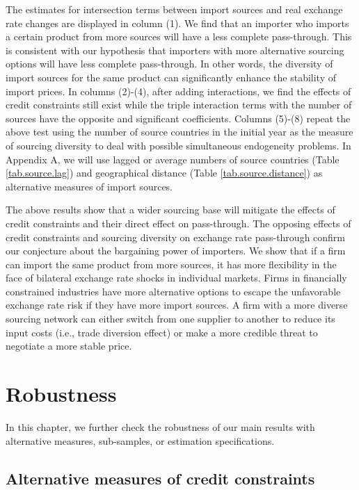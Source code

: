 \documentclass[12pt]{article}
\begin{document}
The estimates for intersection terms between import sources and real exchange rate changes are displayed in column (1). We find that an importer who imports a certain product from more sources will have a less complete pass-through. This is consistent with our hypothesis that importers with more alternative sourcing options will have less complete pass-through. In other words, the diversity of import sources for the same product can significantly enhance the stability of import prices. In columns (2)-(4), after adding interactions, we find the effects of credit constraints still exist while the triple interaction terms with the number of sources have the opposite and significant coefficients. Columns (5)-(8) repeat the above test using the number of source countries in the initial year as the measure of sourcing diversity to deal with possible simultaneous endogeneity problems. In Appendix A, we will use lagged or average numbers of source countries (Table \ref{tab.source.lag}) and geographical distance (Table \ref{tab.source.distance}) as alternative measures of import sources.

The above results show that a wider sourcing base will mitigate the effects of credit constraints and their direct effect on pass-through. The opposing effects of credit constraints and sourcing diversity on exchange rate pass-through confirm our conjecture about the bargaining power of importers. We show that if a firm can import the same product from more sources, it has more flexibility in the face of bilateral exchange rate shocks in individual markets. Firms in financially constrained industries have more alternative options to escape the unfavorable exchange rate risk if they have more import sources. A firm with a more diverse sourcing network can either switch from one supplier to another to reduce its input costs (i.e., trade diversion effect) or make a more credible threat to negotiate a more stable price.

\section{Robustness} \label{Robustness}

In this chapter, we further check the robustness of our main results with alternative measures,  sub-samples, or estimation specifications.

\subsection{Alternative measures of credit constraints}
\end{document}
